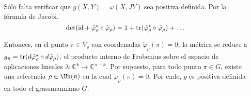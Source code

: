 \begin{solution}
Sólo falta verificar que $g(X,Y) = \omega(X,JY)$ sea positiva definida. Por la fórmula de Jacobi,
$$\det (\operatorname{id} + \, \tilde \varphi_\rho^\star \circ \tilde \varphi_\rho) = 1 + \operatorname{tr} (\tilde \varphi_\rho^\star \circ \tilde \varphi_\rho) + \dots$$

Entonces, en el punto $\pi \in V_\rho$ con coordenadas $\tilde \varphi_\rho(\pi) = 0$, la métrica se reduce a $g_\pi = \operatorname{tr} (d\tilde \varphi_\rho^\star \circ d\tilde \varphi_\rho)$, el producto interno de Frobenius sobre el espacio de aplicaciones lineales $\lambda : \mathbb C^k \to \mathbb C^{n-k}$. Por supuesto, para todo punto $\pi \in G$, existe una referencia $\rho \in \Un(n)$ en la cual $\tilde \varphi_\rho(\pi) = 0$. Por ende, $g$ es positiva definida en todo el grassmanniano $G$.
\end{solution}
